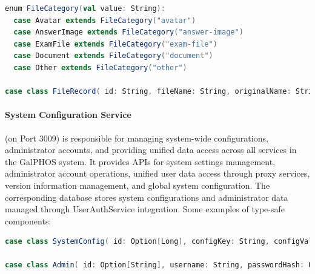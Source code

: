 \documentclass[12pt]{article}
\begin{document}
\begin{lstlisting}[language=Scala]
enum FileCategory(val value: String):
  case Avatar extends FileCategory("avatar")
  case AnswerImage extends FileCategory("answer-image")
  case ExamFile extends FileCategory("exam-file")
  case Document extends FileCategory("document")
  case Other extends FileCategory("other")

case class FileRecord( id: String, fileName: String, originalName: String, fileUrl: String, fileSize: Long, mimeType: String, fileType: Option[String] = None, category: Option[String] = None, examId: Option[String] = None, questionNumber: Option[Int] = None, studentId: Option[String] = None, uploadedBy: String, uploadTime: LocalDateTime )
\end{lstlisting}

\paragraph{System Configuration Service} (on Port 3009) is responsible for managing system-wide configurations, administrator accounts, and providing unified data access across all services in the GalPHOS system. It provides APIs for system settings management, administrator account operations, unified user data access through proxy services, version information management, and global system configuration. The corresponding database stores system configurations and administrator data managed through UserAuthService integration. Some examples of type-safe components:

\begin{lstlisting}[language=Scala]
case class SystemConfig( id: Option[Long], configKey: String, configValue: String, description: Option[String], isPublic: Boolean, createdAt: Option[ZonedDateTime], updatedAt: Option[ZonedDateTime] )

case class Admin( id: Option[String], username: String, passwordHash: Option[String], role: String, isSuperAdmin: Boolean, status: Option[String], createdAt: Option[ZonedDateTime], updatedAt: Option[ZonedDateTime], lastLogin: Option[ZonedDateTime] )
\end{lstlisting}

% 
% 
\end{document}
